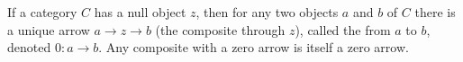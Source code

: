 If a category $C$ has a null object $z$, then for any two objects $a$ and $b$ of $C$ there is a unique arrow $a \rightarrow z \rightarrow b$ (the composite through $z$), called the  from $a$ to $b$, denoted $0: a \rightarrow b$. Any composite with a zero arrow is itself a zero arrow.
